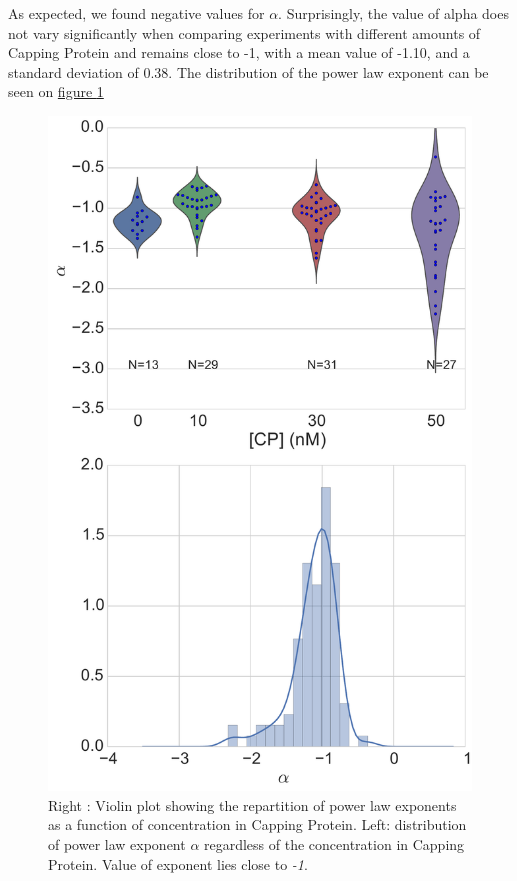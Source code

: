 \documentclass[A4paperpaper,11pt,english]{sphinxmanual}
\begin{document}
As expected, we found negative values for \(\alpha\). Surprisingly, the value
of alpha does not vary significantly when comparing experiments with different
amounts of Capping Protein and remains close to -1, with a mean value of -1.10, and
a standard deviation of 0.38. The distribution of the power law exponent can be
seen on \hyperref[parts/part3:power-law-exponent]{figure  \ref*{parts/part3:power-law-exponent}}
\begin{figure}[htbp]
\centering
\capstart

\includegraphics[width=0.600\linewidth]{alpha_violin.pdf}
\caption{Right : Violin plot showing the repartition of power law exponents as a function of concentration in Capping Protein. Left: distribution of power law exponent
\(\alpha\) regardless of the concentration in Capping Protein. Value of
exponent lies close to \emph{-1}.}\label{parts/part3:power-law-exponent}\end{figure}
\end{document}
